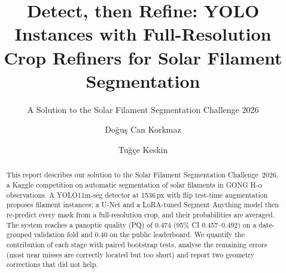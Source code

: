 \documentclass[sigconf]{acmart}
\begin{document}
\title[Detect, then Refine]{Detect, then Refine: YOLO Instances with Full-Resolution Crop Refiners for Solar Filament Segmentation}  %
\subtitle{A Solution to the Solar Filament Segmentation Challenge 2026} %


\author{Doğuş Can Korkmaz}

\author{Tuğçe Keskin}

\begin{abstract}
    This report describes our solution to the Solar Filament Segmentation Challenge~2026, a Kaggle competition on automatic segmentation of solar filaments in GONG H-$\alpha$ observations. A YOLO11m-seg detector at 1536\,px with flip test-time augmentation proposes filament instances; a U-Net and a LoRA-tuned Segment Anything model then re-predict every mask from a full-resolution crop, and their probabilities are averaged. The system reaches a panoptic quality (PQ) of 0.474 (95\% CI 0.457--0.492) on a date-grouped validation fold and 0.40 on the public leaderboard. We quantify the contribution of each stage with paired bootstrap tests, analyse the remaining errors (most near misses are correctly located but too short) and report two geometry corrections that did not help.
\end{abstract}

\maketitle

\ifguideStyle
{}
\par\medskip
\fi
\end{document}
